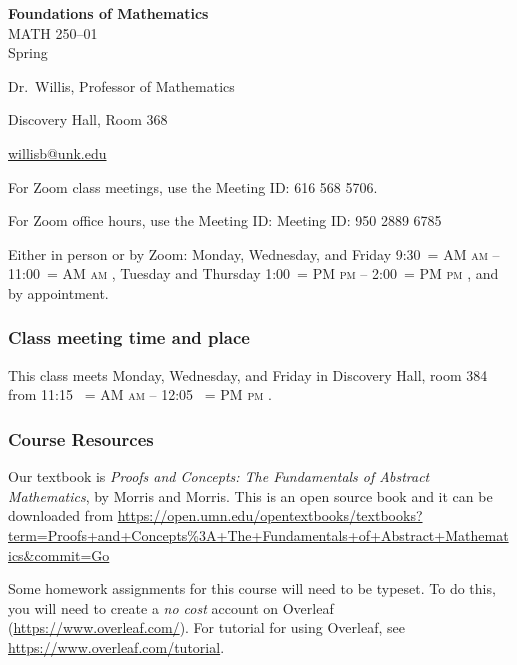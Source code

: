 \documentclass[12pt]{article}
\makeatletter
\newcounter{ex}\setcounter{ex}{0}
\renewenvironment{description}[0]{\begin{compactdesc}}{\end{compactdesc}}
\DeclareRobustCommand{\maybefakesc}[1]{%
  \ifnum\pdfstrcmp{\f@series}{\bfdefault}=\z@
    {\fontsize{\dimexpr0.8\dimexpr\f@size pt\relax}{0}\selectfont\uppercase{#1}}%
  \else
    \textsc{#1}%
  \fi
}
\newcommand\AM{\,\maybefakesc{am}\xspace}
\newcommand\PM{\,\maybefakesc{pm}\xspace}
\newcommand{\coursename}{Foundations of Mathematics}
\newcommand{\coursenumber}{MATH 250}
\newcommand{\sectionnumber}{01}
\newcommand{\term}{Spring }
\newcommand{\meetingtime}{This class meets Monday, Wednesday, and Friday in Discovery Hall, room  384  from 11:15 \AM  -- 12:05 \PM.}
\newcommand{\officehours}{Either in person or by Zoom: Monday, Wednesday, and Friday 9:30\AM -- 11:00\AM,
    Tuesday and Thursday 1:00\PM -- 2:00\PM, and by appointment.}
\makeatother
\begin{document}
\cleanlookdateon%
\shortdate
\printyearoff
\large
\begin{center}
    \textbf{\coursename}  \\
    {\coursenumber--\sectionnumber} \\
     {\term \the\year} \\
\end{center}

\vskip0.25in
\normalsize


\begin{center}
\begin{description}
    \item[Instructor:] Dr.\  Willis, Professor of Mathematics
    \item[Office:]  Discovery Hall, Room 368
    \item[\phone:]   
    \item[\Email:]    \href{mailto:willisb@unk.edu}{willisb@unk.edu}
    \item[Zoom for classes:] For Zoom class meetings, use the Meeting ID: 616 568 5706. 
    \item[Zoom for office hours:] For Zoom office hours, use the Meeting ID: Meeting ID: 950 2889 6785 
    \item[Office Hours:] \officehours
  \end{description}
\end{center}

\subsubsection*{Class meeting time and place}

\meetingtime

\subsubsection*{Course Resources}

\noindent Our textbook is \emph{Proofs and Concepts: The Fundamentals of Abstract Mathematics}, by  Morris and Morris.
This is an open source book and it can be downloaded from \url{https://open.umn.edu/opentextbooks/textbooks?term=Proofs+and+Concepts%3A+The+Fundamentals+of+Abstract+Mathematics&commit=Go}

 Some homework assignments for this course will need to be typeset. To do this, you will need to create a \emph{no cost} 
account on Overleaf (\url{https://www.overleaf.com/}).   For  tutorial for using Overleaf, see \url{https://www.overleaf.com/tutorial}.
\end{document}
